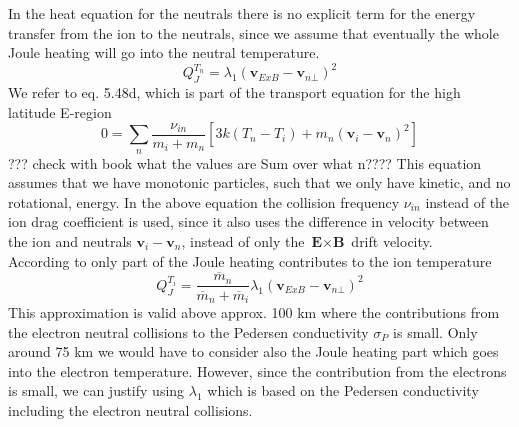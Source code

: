 In the heat equation for the neutrals there is no explicit term for
the energy transfer from the ion to the neutrals, since we assume
that eventually the whole Joule heating will go into the neutral
temperature.
%
\begin{equation}
  Q_J^{T_n} =
  \lambda_1 (\textbf{v}_{ExB}- \textbf{v}_{n\bot})^2
\end{equation}
%
We refer to \cite{Schunk00} eq. 5.48d, which is part of the
transport equation for the high latitude E-region
%
\begin{equation}
  0 = \sum_n \frac{\nu_{in}}{m_i + m_n} [3k(T_n - T_i) + m_n (\textbf{v}_i-\textbf{v}_n)^2]
\end{equation}
%
??? check with book what the values are Sum over what n???? This
equation assumes that we have monotonic particles, such that we only
have kinetic, and no rotational, energy. In the above equation the
collision frequency $\nu_{in}$ instead of the ion drag coefficient
is used, since it also uses the difference in velocity between the
ion and neutrals $\textbf{v}_i-\textbf{v}_n$, instead of only the
$\textbf{E} \times
\textbf{B}$ drift velocity. \\

According to \cite{Schunk00} only part of the Joule heating
contributes to the ion temperature
%
\begin{equation}
  Q_J^{T_i} = \frac{\overline{m}_n}{\overline{m}_n + \overline{m}_i}
  \lambda_1 (\textbf{v}_{ExB}- \textbf{v}_{n\bot})^2
\end{equation}
%
This approximation is valid above approx. 100 km where the
contributions from the electron neutral collisions to the Pedersen
conductivity $\sigma_P$ is small. Only around 75 km we would have to
consider also the Joule heating part which goes into the electron
temperature. However, since the contribution from the electrons is
small, we can justify using $\lambda_1$ which is based on the
Pedersen conductivity including the electron neutral collisions.
%
